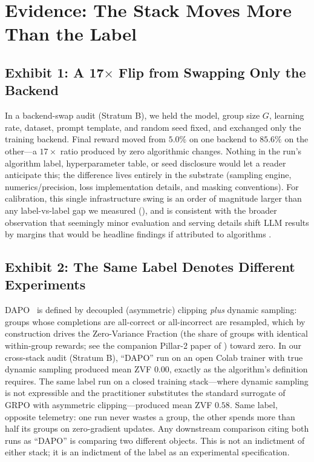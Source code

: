 \section{Evidence: The Stack Moves More Than the Label}
\label{sec:p5-evidence}

\subsection{Exhibit 1: A 17$\times$ Flip from Swapping Only the Backend}
\label{sec:p5-exhibit-backend}
In a backend-swap audit (Stratum B), we held the model, group size $G$, learning
rate, dataset, prompt template, and random seed fixed, and exchanged only the
training backend. Final reward moved from $5.0\%$ on one backend to $85.6\%$ on
the other---a $17\times$ ratio produced by zero algorithmic changes. Nothing in
the run's algorithm label, hyperparameter table, or seed disclosure would let a
reader anticipate this; the difference lives entirely in the substrate
(sampling engine, numerics/precision, loss implementation details, and masking
conventions). For calibration, this single infrastructure swing is an order of
magnitude larger than any label-vs-label gap we measured
(), and is consistent with the broader observation
that seemingly minor evaluation and serving details shift LLM results by
margins that would be headline findings if attributed to algorithms
\citep{biderman2024lessons, hochlehnert2025sober}.

\subsection{Exhibit 2: The Same Label Denotes Different Experiments}
\label{sec:p5-exhibit-label}
DAPO~\citep{yu2025dapo} is defined by decoupled (asymmetric) clipping
\emph{plus} dynamic sampling: groups whose completions are all-correct or
all-incorrect are resampled, which by construction drives the Zero-Variance
Fraction (the share of groups with identical within-group rewards; see the
companion Pillar-2 paper of \ours{}) toward zero. In our cross-stack audit
(Stratum B), ``DAPO'' run on an open Colab trainer with true dynamic sampling
produced mean ZVF $0.00$, exactly as the algorithm's definition requires. The
same label run on a closed training stack---where dynamic sampling is not
expressible and the practitioner substitutes the standard surrogate of GRPO
with asymmetric clipping---produced mean ZVF $0.58$. Same label, opposite
telemetry: one run never wastes a group, the other spends more than half its
groups on zero-gradient updates. Any downstream comparison citing both runs as
``DAPO'' is comparing two different objects. This is not an indictment of
either stack; it is an indictment of the label as an experimental
specification.

